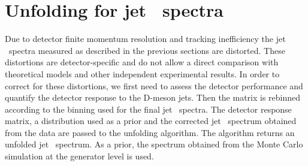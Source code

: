 
\section{Unfolding for jet \pt\ spectra}
\label{sect:unfResults_jet}

Due to detector finite momentum resolution and tracking inefficiency the jet \pt\ spectra measured as described
in the previous sections are distorted. These distortions are detector-specific and do not allow a direct comparison
with theoretical models and other independent experimental results.
In order to correct for these distortions, we first need to assess the detector performance and quantify
the detector response to the D-meson jets. 
Then the matrix is rebinned according to the binning used for the final jet \pt\ spectra. The detector response matrix, a distribution used as a prior and the corrected jet \pt\ spectrum obtained from the data are passed to the unfolding algorithm. The algorithm returns an unfolded jet \pt\ spectrum. As a prior, the spectrum obtained from the Monte Carlo simulation at the generator level is used.

